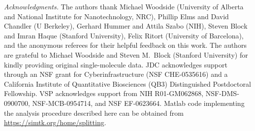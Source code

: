 \documentclass[aps,prl,twocolumn,superscriptaddress,floatfix]{revtex4-1}
\begin{document}
\begin{acknowledgments}
\noindent\emph{Acknowledgments.}
The authors thank Michael Woodside (University of Alberta and National Institute for Nanotechnology, NRC), Phillip Elms and David Chandler (U Berkeley), Gerhard Hummer and Attila Szabo (NIH), Steven Block and Imran Haque (Stanford University), Felix Ritort (University of Barcelona), {\color{black} and the anonymous referees} for their helpful feedback on this work.
The authors are grateful to Michael Woodside and Steven M.~Block (Stanford University) for kindly providing original single-molecule data.
JDC acknowledges support through an NSF grant for Cyberinfrastructure (NSF CHE-0535616) and a California Institute of Quantitative Biosciences (QB3) Distinguished Postdoctoral Fellowship.
VSP acknowledges support from NIH R01-GM062868, NSF-DMS-0900700, NSF-MCB-0954714, and NSF EF-0623664.
Matlab code implementing the analysis procedure described here can be obtained from \url{https://simtk.org/home/splitting}.
\end{acknowledgments}


\end{document}
